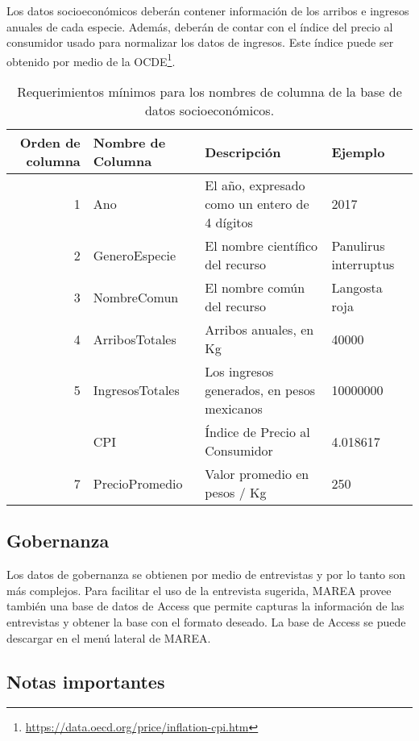 \documentclass[]{krantz}
\renewcommand{\href}[2]{#2\footnote{\url{#1}}}
\begin{document}
Los datos socioeconómicos deberán contener información de los arribos e ingresos anuales de cada especie. Además, deberán de contar con el índice del precio al consumidor usado para normalizar los datos de ingresos. Este índice puede ser obtenido por medio de la \href{https://data.oecd.org/price/inflation-cpi.htm}{OCDE}.

\begin{table}[t]

\caption{\label{tab:formato-soc}Requerimientos mínimos para los nombres de columna de la base de datos socioeconómicos.}
\centering
\begin{tabular}{rlll}
\toprule
Orden de columna & Nombre de Columna & Descripción & Ejemplo\\
\midrule
1 & Ano & El año, expresado como un entero de 4 dígitos & 2017\\
2 & GeneroEspecie & El nombre científico del recurso & Panulirus interruptus\\
3 & NombreComun & El nombre común del recurso & Langosta roja\\
4 & ArribosTotales & Arribos anuales, en Kg & 40000\\
5 & IngresosTotales & Los ingresos generados, en pesos mexicanos & 10000000\\
\addlinespace
6 & CPI & Índice de Precio al Consumidor & 4.018617\\
7 & PrecioPromedio & Valor promedio en pesos / Kg & 250\\
\bottomrule
\end{tabular}
\end{table}

\hypertarget{gobernanza}{%
\subsection{Gobernanza}\label{gobernanza}}

Los datos de gobernanza se obtienen por medio de entrevistas y por lo tanto son más complejos. Para facilitar el uso de la entrevista sugerida, MAREA provee también una base de datos de Access que permite capturas la información de las entrevistas y obtener la base con el formato deseado. La base de Access se puede descargar en el menú lateral de MAREA.

\hypertarget{notas-importantes}{%
\subsection{Notas importantes}\label{notas-importantes}}
\end{document}
